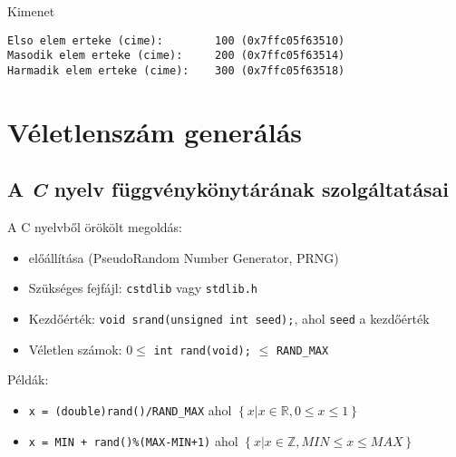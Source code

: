 \documentclass[usenames,dvipsnames,aspectratio=169]{beamer}
\begin{document}
\begin{frame}[fragile]
  \begin{exampleblock}{}
    \vspace{-.2cm}
    \footnotesize
    
    \vspace{-.2cm}
  \end{exampleblock}
  \begin{block}{Kimenet}
    \vspace{-.3cm}
    \begin{verbatim}
Elso elem erteke (cime):        100 (0x7ffc05f63510)
Masodik elem erteke (cime):     200 (0x7ffc05f63514)
Harmadik elem erteke (cime):    300 (0x7ffc05f63518)     
    \end{verbatim}
    \vspace{-.6cm}
  \end{block}
\end{frame}

\begin{frame}
  \begin{exampleblock}{}
    
  \end{exampleblock}
\end{frame}

\section{Véletlenszám generálás}
\subsection{A \emph{C} nyelv függvénykönytárának szolgáltatásai}
\begin{frame}
  A C nyelvből örökölt megoldás:
  \begin{itemize}
    \item {} előállítása 
(PseudoRandom Number Generator, PRNG)
    \item Szükséges fejfájl: \texttt{cstdlib} vagy \texttt{stdlib.h}
    \item Kezdőérték: \texttt{void srand(unsigned int seed);}, ahol \texttt{seed} a kezdőérték
    \item Véletlen számok: $0 \leq$ \texttt{int rand(void);} $\leq$ \texttt{RAND\_MAX}
  \end{itemize}
  \vfill
  Példák:
   \begin{itemize}
     \item \texttt{x = (double)rand()/RAND\_MAX} ahol $\left\{x|x\in\mathbb{R}, 0 \leq x \leq 1 \right\}$
     \item \texttt{x = MIN + rand()\%(MAX-MIN+1)} ahol $\left\{x|x\in\mathbb{Z}, MIN \leq x \leq MAX \right\}$
   \end{itemize}
\end{frame}
\end{document}
